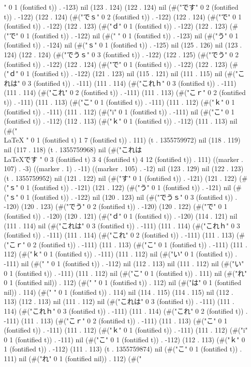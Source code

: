 " 0 1 (fontified t)) . -123) nil (123 . 124) (122 . 124) nil (#("です" 0 2 (fontified t)) . -122) (122 . 124) (#("でｓ" 0 2 (fontified t)) . -122) (122 . 124) (#("で" 0 1 (fontified t)) . -122) (122 . 123) (#("ｄ" 0 1 (fontified t)) . -122) (122 . 123) (#("で" 0 1 (fontified t)) . -122) nil (#("
" 0 1 (fontified t)) . -123) nil (#("う" 0 1 (fontified t)) . -124) nil (#("ｓ" 0 1 (fontified t)) . -125) nil (125 . 126) nil (123 . 124) (122 . 124) (#("でうｓ" 0 3 (fontified t)) . -122) (122 . 125) (#("でう" 0 2 (fontified t)) . -122) (122 . 124) (#("で" 0 1 (fontified t)) . -122) (122 . 123) (#("ｄ" 0 1 (fontified t)) . -122) (121 . 123) nil (115 . 121) nil (111 . 115) nil (#("これは" 0 3 (fontified t)) . -111) (111 . 114) (#("これｈ" 0 3 (fontified t)) . -111) (111 . 114) (#("これ" 0 2 (fontified t)) . -111) (111 . 113) (#("こｒ" 0 2 (fontified t)) . -111) (111 . 113) (#("こ" 0 1 (fontified t)) . -111) (111 . 112) (#("ｋ" 0 1 (fontified t)) . -111) (111 . 112) (#("i" 0 1 (fontified t)) . -111) nil (#("こ" 0 1 (fontified t)) . -112) (112 . 113) (#("ｋ" 0 1 (fontified t)) . -112) (111 . 113) nil (#("\\LaTeX
" 0 1 (fontified t) 1 7 (fontified t)) . 111) (t . 1355759972) nil (118 . 119) nil (117 . 118) (t . 1355759968) nil (#("これは\\LaTeXです
" 0 3 (fontified t) 3 4 (fontified t) 4 12 (fontified t)) . 111) ((marker . 107) . -3) ((marker . 1) . -11) ((marker . 105) . -12) nil (123 . 129) nil (122 . 123) (t . 1355759952) nil (121 . 122) nil (#("す" 0 1 (fontified t)) . -121) (121 . 122) (#("ｓ" 0 1 (fontified t)) . -121) (121 . 122) (#("う" 0 1 (fontified t)) . -121) nil (#("ｓ" 0 1 (fontified t)) . -122) nil (120 . 123) nil (#("でうｓ" 0 3 (fontified t)) . -120) (120 . 123) (#("でう" 0 2 (fontified t)) . -120) (120 . 122) (#("で" 0 1 (fontified t)) . -120) (120 . 121) (#("ｄ" 0 1 (fontified t)) . -120) (114 . 121) nil (111 . 114) nil (#("これは" 0 3 (fontified t)) . -111) (111 . 114) (#("これｈ" 0 3 (fontified t)) . -111) (111 . 114) (#("これ" 0 2 (fontified t)) . -111) (111 . 113) (#("こｒ" 0 2 (fontified t)) . -111) (111 . 113) (#("こ" 0 1 (fontified t)) . -111) (111 . 112) (#("ｋ" 0 1 (fontified t)) . -111) (111 . 112) nil (#("い" 0 1 (fontified t)) . -111) nil (#("
" 0 1 (fontified t)) . -112) nil (112 . 113) nil (111 . 112) nil (#("い" 0 1 (fontified t)) . -111) (111 . 112) nil (#("こ" 0 1 (fontified t)) . 111) nil (#("れ" 0 1 (fontified nil)) . 112) (#("
" 0 1 (fontified t)) . 112) nil (#("は" 0 1 (fontified nil)) . 114) (#("
" 0 1 (fontified t)) . 114) nil (114 . 115) (114 . 115) nil (112 . 113) (112 . 113) nil (111 . 112) nil (#("これは" 0 3 (fontified t)) . -111) (111 . 114) (#("これｈ" 0 3 (fontified t)) . -111) (111 . 114) (#("これ" 0 2 (fontified t)) . -111) (111 . 113) (#("こｒ" 0 2 (fontified t)) . -111) (111 . 113) (#("こ" 0 1 (fontified t)) . -111) (111 . 112) (#("ｋ" 0 1 (fontified t)) . -111) (111 . 112) (#("i" 0 1 (fontified t)) . -111) nil (#("こ" 0 1 (fontified t)) . -112) (112 . 113) (#("ｋ" 0 1 (fontified t)) . -112) (111 . 113) (t . 1355759874) nil (#("こ" 0 1 (fontified t)) . 111) nil (#("れ" 0 1 (fontified nil)) . 112) (#("
